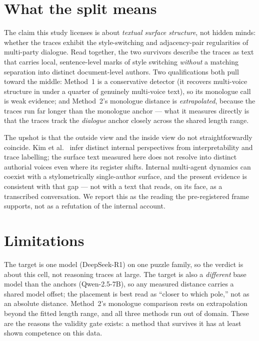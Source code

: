 \documentclass[10pt,twocolumn]{article}
\begin{document}
\section{What the split means}
The claim this study licenses is about \emph{textual surface structure}, not hidden minds: whether
the traces exhibit the style-switching and adjacency-pair regularities of multi-party dialogue.
Read together, the two survivors describe the traces as text that carries local, sentence-level
marks of style switching \emph{without} a matching separation into distinct document-level authors.
Two qualifications both pull toward the middle: Method~1 is a conservative detector (it recovers
multi-voice structure in under a quarter of genuinely multi-voice text), so its monologue call is
weak evidence; and Method~2's monologue distance is \emph{extrapolated}, because the traces run far
longer than the monologue anchor --- what it measures directly is that the traces track the
\emph{dialogue} anchor closely across the shared length range.

The upshot is that the outside view and the inside view do not straightforwardly coincide. Kim et
al.~\cite{kim2026} infer distinct internal perspectives from interpretability and trace labelling;
the surface text measured here does not resolve into distinct authorial voices even where its
register shifts. Internal multi-agent dynamics can coexist with a stylometrically single-author
surface, and the present evidence is consistent with that gap --- not with a text that reads, on its
face, as a transcribed conversation. We report this as the reading the pre-registered frame
supports, not as a refutation of the internal account.

\section{Limitations}
The target is one model (DeepSeek-R1) on one puzzle family, so the verdict is about this cell, not
reasoning traces at large. The target is also a \emph{different} base model than the anchors
(Qwen-2.5-7B), so any measured distance carries a shared model offset; the placement is best read
as ``closer to which pole,'' not as an absolute distance. Method~2's monologue comparison rests on
extrapolation beyond the fitted length range, and all three methods run out of domain. These are the
reasons the validity gate exists: a method that survives it has at least shown competence on this
data.
\end{document}
